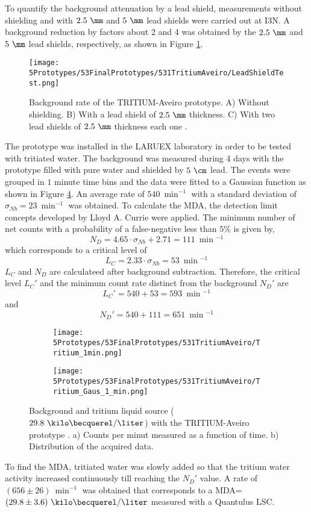 To quantify the background attenuation by a lead shield, measurements without shielding and with $2.5~\mm$ and $5~\mm$ lead shields were carried out at I3N. A background reduction by factors about 2 and 4 was obtained by the $2.5~\mm$ and $5~\mm$ lead shields, respectively, as shown in Figure \ref{fig:LeadShieldTest}.
\begin{figure}[h]
\centering
\texttt{[image: 5Prototypes/53FinalPrototypes/531TritiumAveiro/LeadShieldTest.png]}
\caption{Background rate of the TRITIUM-Aveiro prototype. A) Without shielding. B) With a lead shield of $2.5~\mm$ thickness. C) With two lead shields of $2.5~\mm$ thickness each one \cite{ExperimentalPaperCarlos}.\label{fig:LeadShieldTest}}
\end{figure}

The prototype was installed in the LARUEX laboratory in order to be tested with tritiated water. The background was measured during 4 days with the prototype filled with pure water and shielded by $5~\cm$ lead. The events were grouped in $1$ minute time bins and the data were fitted to a Gaussian function as shown in Figure \ref{fig:BackgroundTritium1min}. An average rate of $540~\min^{-1}$ with a standard deviation of $\sigma_{Nb}=23~\min^{-1}$ was obtained. To calculate the MDA, the detection limit concepts developed by Lloyd A. Currie \cite{CurieLimit} were applied. The minimum number of net counts with a probability of a false-negative less than $5\%$ is given by,
\begin{equation}
N_D = 4.65 \cdot{}\sigma_{Nb} + 2.71 = 111~\min{}^{-1}
\label{eq:EquationNetCounts}
\end{equation}
which corresponds to a critical level of 
$$L_C = 2.33\cdot{}\sigma_{Nb}=53 ~\min{}^{-1}$$
$L_C$ and $N_D$ are calculateed after background subtraction. Therefore, the critical level $L_C'$ and the minimum count rate distinct from the background $N_D'$ are $$L_C'=540+53 = 593~\min{}^{-1}$$ and $$N_D'= 540+111=651~\min{}^{-1}$$
\begin{figure}
\centering
    \begin{subfigure}[b]{0.45\textwidth}
    \centering
    \texttt{[image: 5Prototypes/53FinalPrototypes/531TritiumAveiro/Tritium\_1min.png]}  
    \caption{\label{subfig:MeasurementInRealTime}}
    \end{subfigure}
    \hfill
    \begin{subfigure}[b]{0.45\textwidth}
    \centering
    \texttt{[image: 5Prototypes/53FinalPrototypes/531TritiumAveiro/Tritium\_Gaus\_1\_min.png]}  
    \caption{\label{subfig:DistributionofMeasurement}}
    \end{subfigure}
 \caption{Background and tritium liquid source ($29.8~\kilo\becquerel/\liter$) with the TRITIUM-Aveiro prototype \cite{ExperimentalPaperCarlos}. a) Counts per minut measured as a function of time. b) Distribution of the acquired data.}
 \label{fig:BackgroundTritium1min}
\end{figure}
To find the MDA, tritiated water was slowly added  so that the tritium water activity increased continuously till reaching the $N_D'$ value. A rate of $(656 \pm 26)~\min^{-1}$ was obtained that corresponds to a MDA=$(29.8\pm 3.6)~\kilo\becquerel/\liter$ measured with a Quantulus LSC.

